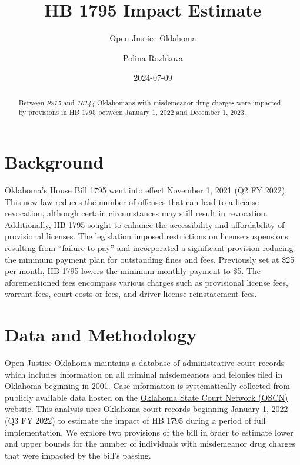 \documentclass[
  letterpaper,
  DIV=11,
  numbers=noendperiod]{scrartcl}
\title{HB 1795 Impact Estimate}
\subtitle{Open Justice Oklahoma}
\author{Polina Rozhkova}
\date{2024-07-09}
\begin{document}
\maketitle
\begin{abstract}
Between \emph{9215} and \emph{16144} Oklahomans with misdemeanor drug
charges were impacted by provisions in HB 1795 between January 1, 2022
and December 1, 2023.
\end{abstract}


\section{Background}\label{background}

Oklahoma's
\href{http://webserver1.lsb.state.ok.us/cf_pdf/2021-22\%20ENR/hB/HB1795\%20ENR.PDF}{House
Bill 1795} went into effect November 1, 2021 (Q2 FY 2022). This new law
reduces the number of offenses that can lead to a license revocation,
although certain circumstances may still result in revocation.
Additionally, HB 1795 sought to enhance the accessibility and
affordability of provisional licenses. The legislation imposed
restrictions on license suspensions resulting from ``failure to pay''
and incorporated a significant provision reducing the minimum payment
plan for outstanding fines and fees. Previously set at \$25 per month,
HB 1795 lowers the minimum monthly payment to \$5. The aforementioned
fees encompass various charges such as provisional license fees, warrant
fees, court costs or fees, and driver license reinstatement fees.

\section{Data and Methodology}\label{data-and-methodology}

Open Justice Oklahoma maintains a database of administrative court
records which includes information on all criminal misdemeanors and
felonies filed in Oklahoma beginning in 2001. Case information is
systematically collected from publicly available data hosted on the
\href{https://www.oscn.net/v4/}{Oklahoma State Court Network (OSCN)}
website. This analysis uses Oklahoma court records beginning January 1,
2022 (Q3 FY 2022) to estimate the impact of HB 1795 during a period of
full implementation. We explore two provisions of the bill in order to
estimate lower and upper bounds for the number of individuals with
misdemeanor drug charges that were impacted by the bill's passing.
\end{document}
